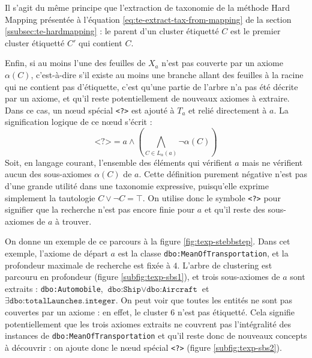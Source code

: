 Il s'agit du même principe que l'extraction de taxonomie de la méthode Hard Mapping présentée à l'équation \ref{eq:te-extract-tax-from-mapping} de la section \ref{ssubsec:te-hardmapping} : le parent d'un cluster étiquetté $C$ est le premier cluster étiquetté $C'$ qui contient $C$.


Enfin, si au moins l'une des feuilles de $X_a$ n'est pas couverte par un axiome $\alpha(C)$, c'est-à-dire s'il existe au moins une branche allant des feuilles à la racine qui ne contient pas d'étiquette, c'est qu'une partie de l'arbre n'a pas été décrite par un axiome, et qu'il reste potentiellement de nouveaux axiomes à extraire. Dans ce cas, un nœud spécial \texttt{<?>} est ajouté à $T_a$ et relié directement à $a$. La signification logique de ce nœud s'écrit :
\begin{equation}
    \texttt{<?>} = a \land \left( \bigwedge\limits_{C \in L_\alpha(a)} \neg \alpha(C) \right)
    \label{eq:texp-special-node}
\end{equation}
Soit, en langage courant, l'ensemble des éléments qui vérifient $a$ mais ne vérifient aucun des sous-axiomes $\alpha(C)$ de $a$. Cette définition purement négative n'est pas d'une grande utilité dans une taxonomie expressive, puisqu'elle exprime simplement la tautologie $C \lor \neg C = \top$. On utilise donc le symbole \texttt{<?>} pour signifier que la recherche n'est pas encore finie pour $a$ et qu'il reste des sous-axiomes de $a$ à trouver.

On donne un exemple de ce parcours à la figure \ref{fig:texp-stebbstep}. Dans cet exemple, l'axiome de départ $a$ est la classe \texttt{dbo:MeanOfTransportation}, et la profondeur maximale de recherche est fixée à $4$. L'arbre de clustering est parcouru en profondeur (figure \ref{subfig:texp-sbs1}), et trois sous-axiomes de $a$ sont extraits : \texttt{dbo:Automobile}, $\texttt{dbo:Ship} \lor \texttt{dbo:Aircraft}$ et $\exists \texttt{dbo:totalLaunches} . \texttt{integer}$. On peut voir que toutes les entités ne sont pas couvertes par un axiome : en effet, le cluster 6 n'est pas étiquetté. Cela signifie potentiellement que les trois axiomes extraits ne couvrent pas l'intégralité des instances de \texttt{dbo:MeanOfTransportation} et qu'il reste donc de nouveaux concepts à découvrir : on ajoute donc le nœud spécial \texttt{<?>} (figure \ref{subfig:texp-sbs2}).


